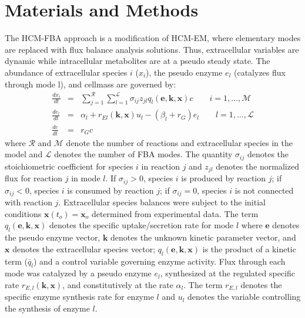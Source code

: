 \documentclass[10pt,twocolumn,twoside,final]{IEEEtran}
\begin{document}
\section{Materials and Methods}
The HCM-FBA approach is a modification of HCM-EM, where elementary modes are replaced with flux balance analysis solutions.
Thus, extracellular variables are dynamic while intracellular metabolites are at a pseudo steady state.
The abundance of extracellular species $i$ ($x_{i}$), the pseudo enzyme $e_{l}$ (catalyzes flux through mode l), and cellmass are governed by:
\begin{eqnarray}\nonumber
	\frac{dx_{i}}{dt}  & = &  \sum_{j = 1}^{\mathcal{R}}\sum_{l = 1}^{\mathcal{L}}\sigma_{ij}z_{jl}q_{l}\left(\mathbf{e},\mathbf{k},\mathbf{x}\right)c \qquad{i=1,\hdots,\mathcal{M}}\\\nonumber
  \frac{de_{l}}{dt}  & = & \alpha_{l} + r_{El}\left(\mathbf{k},\mathbf{x}\right)u_{l} - \left(\beta_{l}+r_{G}\right)e_{l} \qquad l=1,\hdots,\mathcal{L} \\\nonumber
  \frac{dc}{dt} & = & r_{G}c
\end{eqnarray}
where $\mathcal{R}$ and $\mathcal{M}$ denote the number of reactions and extracellular species in the model and $\mathcal{L}$ denotes the number of FBA modes.
The quantity $\sigma_{ij}$ denotes the stoichiometric coefficient for species $i$ in reaction $j$ and $z_{jl}$ denotes the normalized flux for reaction $j$ in mode $l$.
If $\sigma_{ij}>0$, species $i$ is produced by reaction $j$;
if $\sigma_{ij}<0$, species $i$ is consumed by reaction $j$; if $\sigma_{ij} = 0$, species $i$ is not connected with reaction $j$.
Extracellular species balances were subject to the initial conditions $\mathbf{x}\left(t_{o}\right) = \mathbf{x}_{o}$ determined from experimental data.
The term $q_{l}\left(\mathbf{e},\mathbf{k},\mathbf{x}\right)$ denotes the specific uptake/secretion rate for mode $l$
where $\mathbf{e}$ denotes the pseudo enzyme vector, $\mathbf{k}$ denotes the unknown kinetic parameter vector, and $\mathbf{x}$ denotes the extracellular species vector;
$q_{l}\left(\mathbf{e},\mathbf{k},\mathbf{x}\right)$ is the product of a kinetic term ($\bar{q}_{l}$) and a control variable governing enzyme activity.
Flux through each mode was catalyzed by a pseudo enzyme $e_{l}$, synthesized at the regulated specific rate $r_{E,l}\left(\mathbf{k},\mathbf{x}\right)$, and constitutively at the rate $\alpha_{l}$.
The term $r_{E,l}$ denotes the specific enzyme synthesis rate for enzyme $l$ and $u_{l}$ denotes the variable controlling the synthesis of enzyme $l$.
\end{document}
